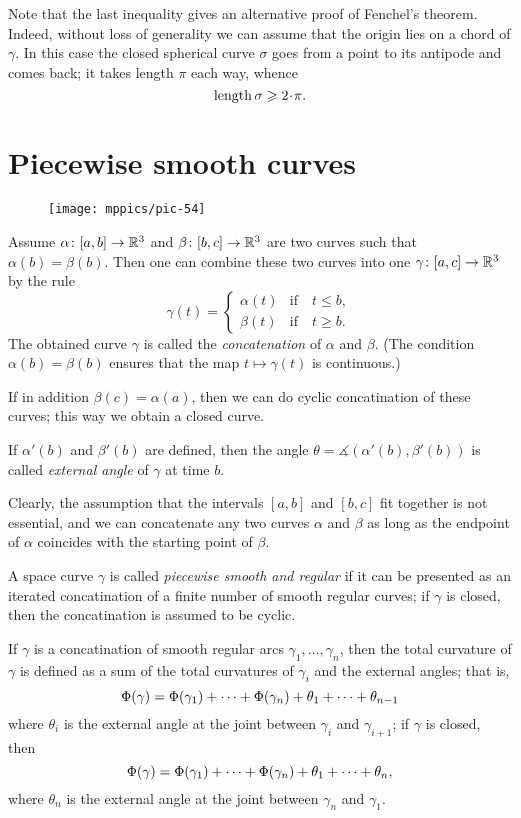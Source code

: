 Note that the last inequality gives an alternative proof of Fenchel's theorem.
Indeed, without loss of generality we can assume that the origin lies on a chord of $\gamma$.
In this case the closed spherical curve $\sigma$ goes from a point to its antipode and comes back; 
it takes length $\pi$ each way, 
whence 
\[\length\sigma\ge 2\cdot\pi.\]



\section*{Piecewise smooth curves}

{

\begin{wrapfigure}{o}{25 mm}
\vskip-3mm
\centering
\texttt{[image: mppics/pic-54]}
\end{wrapfigure}

Assume $\alpha\colon[a,b]\to \mathbb{R}^3$ and $\beta\:[b,c]\z\to \RR^3$ are two curves such that $\alpha(b)=\beta(b)$.
Then one can combine these two curves into one $\gamma\:[a,c]\z\to \RR^3$ by the rule 
\[\gamma(t)=
\begin{cases}
\alpha(t)&\text{if}\quad t\le b,
\\
\beta(t)&\text{if}\quad t\ge b.
\end{cases}
\]
The obtained curve $\gamma$ is called the 
\emph{concatenation} of $\alpha$ and $\beta$. %
(The condition $\alpha(b)=\beta(b)$ ensures that the map $t\mapsto\gamma(t)$ is continuous.)

}

If in addition $\beta(c)=\alpha(a)$, then we can do cyclic concatination of these curves;
this way we obtain a closed curve.

If $\alpha'(b)$ and $\beta'(b)$ are defined, then the angle $\theta=\measuredangle(\alpha'(b),\beta'(b))$ is called \emph{external angle} of $\gamma$ at time $b$.

Clearly, the assumption that the intervals $[a,b]$ and $[b,c]$ fit together is not essential, and we can concatenate any two curves $\alpha$ and $\beta$ as long as the endpoint of $\alpha$ coincides with the starting point of $\beta$. 

A space curve $\gamma$ is called \emph{piecewise smooth and regular} if it can be presented as an iterated concatination of a finite number of smooth regular curves; if $\gamma$ is closed, then the  concatination is assumed to be cyclic.

If $\gamma$ is a concatination of smooth regular arcs $\gamma_1,\dots,\gamma_n$, then the total curvature of $\gamma$ is defined as a sum of the total curvatures of $\gamma_i$ and the external angles;
that is, 
\[\Phi({\gamma})=\Phi({\gamma_1})+\dots+\Phi({\gamma_n})+\theta_1+\dots+\theta_{n-1}\]
where $\theta_i$ is the external angle at the joint between $\gamma_i$ and $\gamma_{i+1}$;
if $\gamma$ is closed, then 
\[\Phi({\gamma})=\Phi({\gamma_1})+\dots+\Phi({\gamma_n})+\theta_1+\dots+\theta_{n},\]
where $\theta_n$ is the external angle at the joint between $\gamma_n$ and $\gamma_1$.


